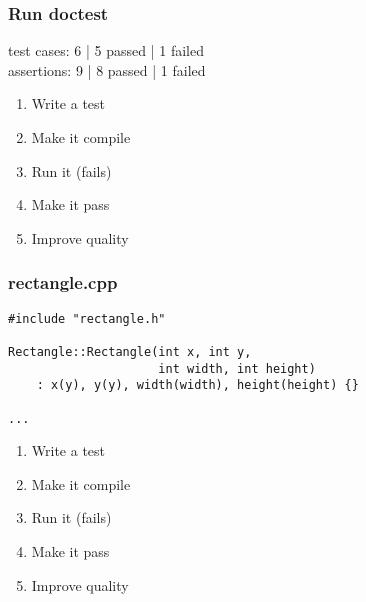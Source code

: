 \begin{frame}[fragile]
\frametitle{Run doctest}
\begin{minipage}[t]{0.48\linewidth}
test cases: 6 | 5 passed | 1 failed\\
assertions: 9 | 8 passed | 1 failed\\
\end{minipage}\hfill
\begin{minipage}[t]{0.28\linewidth}
  \small
  \begin{enumerate} 
    \item \textcolor{deadcolor}{Write a test}
    \item \textcolor{deadcolor}{Make it compile}
    \item \textcolor{activecolor}{Run it (fails)}
    \item \textcolor{deadcolor}{Make it pass}
    \item \textcolor{deadcolor}{Improve quality}
  \end{enumerate} 
\end{minipage}
\end{frame}

\begin{frame}[fragile]
\frametitle{rectangle.cpp}
\begin{minipage}[t]{0.48\linewidth}
\begin{lstlisting}
#include "rectangle.h"

Rectangle::Rectangle(int x, int y, 
                     int width, int height)
    : x(y), y(y), width(width), height(height) {}

...
\end{lstlisting}
\end{minipage}\hfill
\begin{minipage}[t]{0.28\linewidth}
  \small
  \begin{enumerate} 
    \item \textcolor{deadcolor}{Write a test}
    \item \textcolor{deadcolor}{Make it compile}
    \item \textcolor{deadcolor}{Run it (fails)}
    \item \textcolor{activecolor}{Make it pass}
    \item \textcolor{deadcolor}{Improve quality}
  \end{enumerate} 
\end{minipage}
\end{frame}


